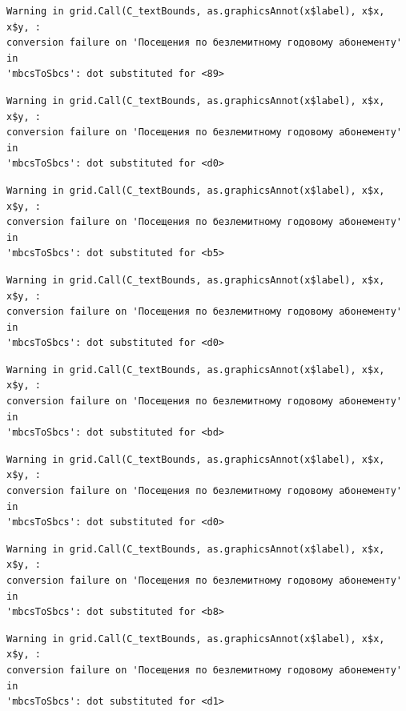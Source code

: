 \documentclass[
  letterpaper,
  DIV=11,
  numbers=noendperiod]{scrartcl}
\begin{document}
\begin{verbatim}
Warning in grid.Call(C_textBounds, as.graphicsAnnot(x$label), x$x, x$y, :
conversion failure on 'Посещения по безлемитному годовому абонементу' in
'mbcsToSbcs': dot substituted for <89>
\end{verbatim}

\begin{verbatim}
Warning in grid.Call(C_textBounds, as.graphicsAnnot(x$label), x$x, x$y, :
conversion failure on 'Посещения по безлемитному годовому абонементу' in
'mbcsToSbcs': dot substituted for <d0>
\end{verbatim}

\begin{verbatim}
Warning in grid.Call(C_textBounds, as.graphicsAnnot(x$label), x$x, x$y, :
conversion failure on 'Посещения по безлемитному годовому абонементу' in
'mbcsToSbcs': dot substituted for <b5>
\end{verbatim}

\begin{verbatim}
Warning in grid.Call(C_textBounds, as.graphicsAnnot(x$label), x$x, x$y, :
conversion failure on 'Посещения по безлемитному годовому абонементу' in
'mbcsToSbcs': dot substituted for <d0>
\end{verbatim}

\begin{verbatim}
Warning in grid.Call(C_textBounds, as.graphicsAnnot(x$label), x$x, x$y, :
conversion failure on 'Посещения по безлемитному годовому абонементу' in
'mbcsToSbcs': dot substituted for <bd>
\end{verbatim}

\begin{verbatim}
Warning in grid.Call(C_textBounds, as.graphicsAnnot(x$label), x$x, x$y, :
conversion failure on 'Посещения по безлемитному годовому абонементу' in
'mbcsToSbcs': dot substituted for <d0>
\end{verbatim}

\begin{verbatim}
Warning in grid.Call(C_textBounds, as.graphicsAnnot(x$label), x$x, x$y, :
conversion failure on 'Посещения по безлемитному годовому абонементу' in
'mbcsToSbcs': dot substituted for <b8>
\end{verbatim}

\begin{verbatim}
Warning in grid.Call(C_textBounds, as.graphicsAnnot(x$label), x$x, x$y, :
conversion failure on 'Посещения по безлемитному годовому абонементу' in
'mbcsToSbcs': dot substituted for <d1>
\end{verbatim}
\end{document}
